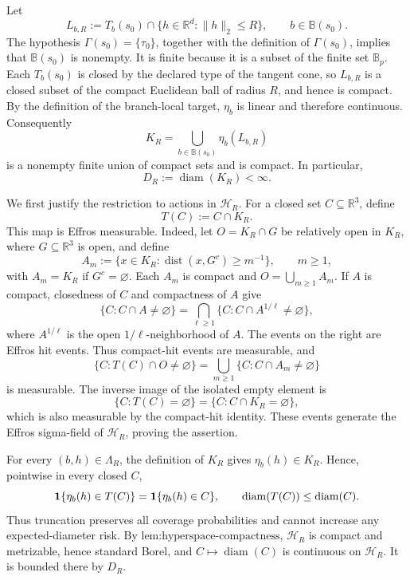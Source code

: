 Let
\[
L_{b,R}:=T_b(s_0)\cap\{h\in\mathbb R^d:\|h\|_2\le R\},
\qquad b\in\mathbb B(s_0).
\]
The hypothesis \(\Gamma(s_0)=\{\tau_0\}\), together with the definition of \(\Gamma(s_0)\), implies that \(\mathbb B(s_0)\) is nonempty.  It is finite because it is a subset of the finite set \(\mathbb B_p\).  Each \(T_b(s_0)\) is closed by the declared type of the tangent cone, so \(L_{b,R}\) is a closed subset of the compact Euclidean ball of radius \(R\), and hence is compact.  By the definition of the branch-local target, \(\eta_b\) is linear and therefore continuous.  Consequently
\[
K_R
=\bigcup_{b\in\mathbb B(s_0)}\eta_b(L_{b,R})
\]
is a nonempty finite union of compact sets and is compact.  In particular,
\[
D_R:=\operatorname{diam}(K_R)<\infty.
\]

We first justify the restriction to actions in \(\mathcal H_R\).  For a closed set \(C\subseteq\mathbb R^3\), define
\[
T(C):=C\cap K_R.
\]
This map is Effros measurable.  Indeed, let \(O=K_R\cap G\) be relatively open in \(K_R\), where \(G\subseteq\mathbb R^3\) is open, and define
\[
A_m:=\{x\in K_R:\operatorname{dist}(x,G^c)\ge m^{-1}\},
\qquad m\ge1,
\]
with \(A_m=K_R\) if \(G^c=\varnothing\).  Each \(A_m\) is compact and \(O=\bigcup_{m\ge1}A_m\).  If \(A\) is compact, closedness of \(C\) and compactness of \(A\) give
\[
\{C:C\cap A\ne\varnothing\}
=\bigcap_{\ell\ge1}\{C:C\cap A^{1/\ell}\ne\varnothing\},
\]
where \(A^{1/\ell}\) is the open \(1/\ell\)-neighborhood of \(A\).  The events on the right are Effros hit events.  Thus compact-hit events are measurable, and
\[
\{C:T(C)\cap O\ne\varnothing\}
=\bigcup_{m\ge1}\{C:C\cap A_m\ne\varnothing\}
\]
is measurable.  The inverse image of the isolated empty element is
\[
\{C:T(C)=\varnothing\}=\{C:C\cap K_R=\varnothing\},
\]
which is also measurable by the compact-hit identity.  These events generate the Effros sigma-field of \(\mathcal H_R\), proving the assertion.

For every \((b,h)\in\Lambda_R\), the definition of \(K_R\) gives \(\eta_b(h)\in K_R\).  Hence, pointwise in every closed \(C\),
\[
{\bf1}\{\eta_b(h)\in T(C)\}
={\bf1}\{\eta_b(h)\in C\},
\qquad
\operatorname{diam}(T(C))\le\operatorname{diam}(C).
\]
Thus truncation preserves all coverage probabilities and cannot increase any expected-diameter risk.  By \(\text{lem:hyperspace-compactness}\), \(\mathcal H_R\) is compact and metrizable, hence standard Borel, and \(C\mapsto\operatorname{diam}(C)\) is continuous on \(\mathcal H_R\).  It is bounded there by \(D_R\).

